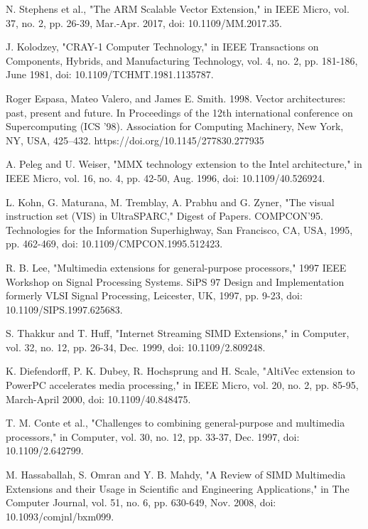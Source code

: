 \documentclass[conference]{IEEEtran}
\begin{document}


\begin{thebibliography}{00}

 N. Stephens et al., "The ARM Scalable Vector Extension," in IEEE Micro, vol. 37, no. 2, pp. 26-39, Mar.-Apr. 2017, doi: 10.1109/MM.2017.35.

 J. Kolodzey, "CRAY-1 Computer Technology," in IEEE Transactions on Components, Hybrids, and Manufacturing Technology, vol. 4, no. 2, pp. 181-186, June 1981, doi: 10.1109/TCHMT.1981.1135787.

 Roger Espasa, Mateo Valero, and James E. Smith. 1998. Vector architectures: past, present and future. In Proceedings of the 12th international conference on Supercomputing (ICS '98). Association for Computing Machinery, New York, NY, USA, 425–432. https://doi.org/10.1145/277830.277935

 A. Peleg and U. Weiser, "MMX technology extension to the Intel architecture," in IEEE Micro, vol. 16, no. 4, pp. 42-50, Aug. 1996, doi: 10.1109/40.526924.

 L. Kohn, G. Maturana, M. Tremblay, A. Prabhu and G. Zyner, "The visual instruction set (VIS) in UltraSPARC," Digest of Papers. COMPCON'95. Technologies for the Information Superhighway, San Francisco, CA, USA, 1995, pp. 462-469, doi: 10.1109/CMPCON.1995.512423.

 R. B. Lee, "Multimedia extensions for general-purpose processors," 1997 IEEE Workshop on Signal Processing Systems. SiPS 97 Design and Implementation formerly VLSI Signal Processing, Leicester, UK, 1997, pp. 9-23, doi: 10.1109/SIPS.1997.625683.

 S. Thakkur and T. Huff, "Internet Streaming SIMD Extensions," in Computer, vol. 32, no. 12, pp. 26-34, Dec. 1999, doi: 10.1109/2.809248.

 K. Diefendorff, P. K. Dubey, R. Hochsprung and H. Scale, "AltiVec extension to PowerPC accelerates media processing," in IEEE Micro, vol. 20, no. 2, pp. 85-95, March-April 2000, doi: 10.1109/40.848475.

 T. M. Conte et al., "Challenges to combining general-purpose and multimedia processors," in Computer, vol. 30, no. 12, pp. 33-37, Dec. 1997, doi: 10.1109/2.642799.

 M. Hassaballah, S. Omran and Y. B. Mahdy, "A Review of SIMD Multimedia Extensions and their Usage in Scientific and Engineering Applications," in The Computer Journal, vol. 51, no. 6, pp. 630-649, Nov. 2008, doi: 10.1093/comjnl/bxm099.


\end{thebibliography}
\end{document}
